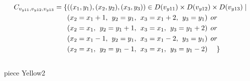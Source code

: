 \begin{align*}
C_{v_{y11},v_{y12},v_{y13}}=\{&((x_{1},y_{1}),(x_{2},y_{2}),(x_{3},y_{3}))\in D(v_{y11})\times D(v_{y12})\times D(v_{y13})\mid\\
&(x_{2} = x_{1} + 1,\hspace{1ex}y_{2} = y_{1},\hspace{1ex}x_{3} = x_{1} + 2, \hspace{1ex}y_{3} = y_{1})\hspace{1ex} or\\
&(x_{2} = x_{1},\hspace{1ex}y_{2} = y_{1}+1,\hspace{1ex}x_{3} = x_{1}, \hspace{1ex}y_{3} = y_{1}+2)\hspace{1ex} or\\
&(x_{2} = x_{1}-1,\hspace{1ex}y_{2} = y_{1},\hspace{1ex}x_{3} = x_{1}-2,\hspace{1ex} y_{3} = y_{1})\hspace{1ex} or\\
&(x_{2} = x_{1},\hspace{1ex}y_{2} = y_{1}-1,\hspace{1ex}x_{3} = x_{1}, \hspace{1ex}y_{3} = y_{1}-2)\hspace{3ex} \}
\end{align*} 
\\ piece Yellow2
